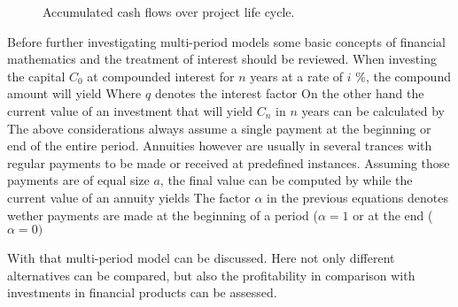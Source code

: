         \begin{figure}
            
            \caption{Accumulated cash flows over project life cycle.}
            \label{fig:CashFlow}
        \end{figure}

        Before further investigating multi-period models some basic concepts of financial mathematics
        and the treatment of interest should be reviewed. When investing the capital $C_0$ at compounded
        interest for $n$ years at a rate of $i$ \%, the compound amount will yield
        Where $q$ denotes the interest factor
        On the other hand the current value of an investment that will yield $C_n$ in $n$ years can be calculated
        by
        The above considerations always assume a single payment at the beginning or end of the entire period.
        Annuities however are usually in several trances with regular payments to be made or received at
        predefined instances. Assuming those payments are of equal size $a$, the final value can be computed by
        while the current value of an annuity yields
        The factor $\alpha$ in the previous equations denotes wether payments are made at the beginning
        of a period ($\alpha = 1$ or at the end ($\alpha = 0)$

        With that multi-period model can be discussed. Here not only different alternatives can be compared,
        but also the profitability in comparison with investments in financial products can be assessed.

